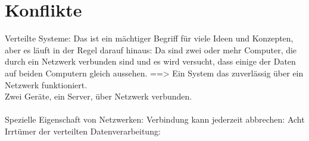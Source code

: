 \section{\label{sec:conflict}Konflikte}
Verteilte Systeme: Das ist ein mächtiger Begriff für viele Ideen und Konzepten, aber es läuft in der Regel darauf hinaus: Da sind zwei oder mehr Computer, die durch ein Netzwerk verbunden sind und es wird versucht, dass einige der Daten auf beiden Computern gleich aussehen. ==> Ein System das zuverlässig über ein Netzwerk funktioniert.\\
Zwei Geräte, ein Server, über Netzwerk verbunden.\\\\
Spezielle Eigenschaft von Netzwerken: Verbindung kann jederzeit abbrechen:
Acht Irrtümer der verteilten Datenverarbeitung:
